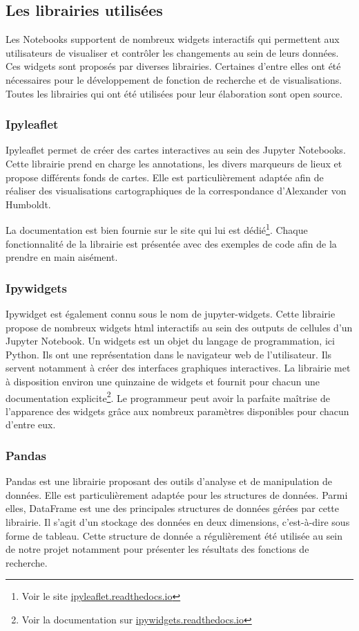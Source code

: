 \documentclass[a4paper, 12pt, twoside]{book}
\begin{document}
\subsection{Les librairies utilisées}

Les Notebooks supportent de nombreux widgets interactifs qui permettent aux utilisateurs de visualiser et contrôler les changements au sein de leurs données. Ces widgets sont proposés par diverses librairies. Certaines d'entre elles ont été nécessaires pour le développement de fonction de recherche et de visualisations. Toutes les librairies qui ont été utilisées pour leur élaboration sont open source.

\subsubsection{Ipyleaflet}
Ipyleaflet permet de créer des cartes interactives au sein des Jupyter Notebooks. Cette librairie prend en charge les annotations, les divers marqueurs de lieux et propose différents fonds de cartes.
Elle est particulièrement adaptée afin de réaliser des visualisations cartographiques de la correspondance d'Alexander von Humboldt.

La documentation est bien fournie sur le site qui lui est dédié\footnote{Voir le site \href{https://ipyleaflet.readthedocs.io/}{ipyleaflet.readthedocs.io}}. Chaque fonctionnalité de la librairie est présentée avec des exemples de code afin de la prendre en main aisément. 

\subsubsection{Ipywidgets}
Ipywidget est également connu sous le nom de jupyter-widgets. Cette librairie propose de nombreux widgets \gls{html} interactifs au sein des outputs de cellules d'un Jupyter Notebook. 
Un widgets est un objet du langage de programmation, ici Python. Ils ont une représentation dans le navigateur web de l'utilisateur. Ils servent notamment à créer des interfaces graphiques interactives. 
La librairie met à disposition environ une quinzaine de widgets et fournit pour chacun une documentation explicite\footnote{Voir la documentation sur \href{https://ipywidgets.readthedocs.io/}{ipywidgets.readthedocs.io}}. Le programmeur peut avoir la parfaite maîtrise de l'apparence des widgets grâce aux nombreux paramètres disponibles pour chacun d'entre eux. 

\subsubsection{Pandas}
Pandas est une librairie proposant des outils d'analyse et de manipulation de données. Elle est particulièrement adaptée pour les structures de données. Parmi elles, DataFrame est une des principales structures de données gérées par cette librairie. Il s'agit d'un stockage des données en deux dimensions, c'est-à-dire sous forme de tableau. Cette structure de donnée a régulièrement été utilisée au sein de notre projet notamment pour présenter les résultats des fonctions de recherche. 
\end{document}
